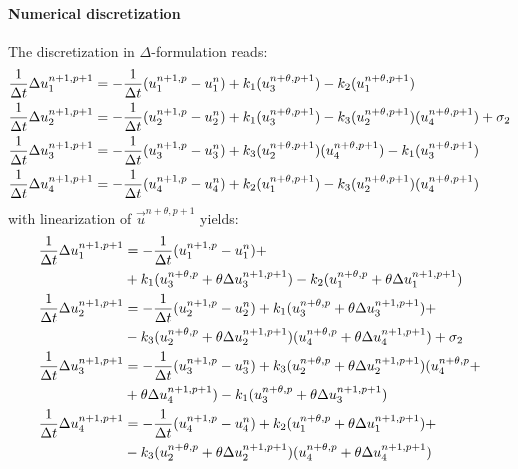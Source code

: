 \paragraph*{Numerical discretization}\label{sec:air_pollution_discretization}
The discretization in $\Delta$-formulation reads:
\begin{align}
    \frac{1}{\Delta t}\Delta u_1^{n+1, p+1} & = - \frac{1}{\Delta t}(u_1^{n+1,p} - u_1^n) + k_1 (u_3^{n+\theta,p+1}) - k_2 (u_1^{n+\theta,p+1})
    \\
    \frac{1}{\Delta t}\Delta u_2^{n+1, p+1} & = - \frac{1}{\Delta t}(u_2^{n+1,p} - u_2^n) + k_1(u_3^{n+\theta,p+1}) - k_3 (u_2^{n+\theta,p+1}) (u_4^{n+\theta,p+1}) +\sigma_2
    \\
    \frac{1}{\Delta t}\Delta u_3^{n+1, p+1} & = - \frac{1}{\Delta t}(u_3^{n+1,p} - u_3^n) + k_3 (u_2^{n+\theta,p+1}) (u_4^{n+\theta,p+1}) - k_1(u_3^{n+\theta,p+1})
    \\
    \frac{1}{\Delta t}\Delta u_4^{n+1, p+1} & = - \frac{1}{\Delta t}(u_4^{n+1,p} - u_4^n) + k_2(u_1^{n+\theta,p+1}) - k_3 (u_2^{n+\theta,p+1}) (u_4^{n+\theta,p+1})
\end{align}
with linearization of $\vec{u}^{n+\theta,p+1}$ yields:
\begin{align}
    \frac{1}{\Delta t}\Delta u_1^{n+1, p+1} & =
    - \frac{1}{\Delta t}(u_1^{n+1,p} - u_1^n) +
    \nonumber \\*
    & + k_1 (u_3^{n+\theta,p} + \theta \Delta u_3^{n+1, p+1}) - k_2 (u_1^{n+\theta,p} + \theta \Delta u_1^{n+1, p+1})
    \\
    \frac{1}{\Delta t}\Delta u_2^{n+1, p+1} & = - \frac{1}{\Delta t}(u_2^{n+1,p} - u_2^n) + k_1(u_3^{n+\theta,p} + \theta \Delta u_3^{n+1, p+1}) +
    \nonumber \\*
    & - k_3 (u_2^{n+\theta,p} + \theta \Delta u_2^{n+1, p+1}) (u_4^{n+\theta,p} + \theta \Delta u_4^{n+1, p+1}) +\sigma_2
    \\
    \frac{1}{\Delta t}\Delta u_3^{n+1, p+1} & = - \frac{1}{\Delta t}(u_3^{n+1,p} - u_3^n) + k_3 (u_2^{n+\theta,p} + \theta \Delta u_2^{n+1, p+1}) (u_4^{n+\theta,p} +
    \nonumber \\*
    & +  \theta \Delta u_4^{n+1, p+1}) - k_1(u_3^{n+\theta,p} + \theta \Delta u_3^{n+1, p+1})
    \\
    \frac{1}{\Delta t}\Delta u_4^{n+1, p+1} & = - \frac{1}{\Delta t}(u_4^{n+1,p} - u_4^n) + k_2(u_1^{n+\theta,p} + \theta \Delta u_1^{n+1, p+1}) +
    \nonumber \\*
    & - k_3 (u_2^{n+\theta,p} + \theta \Delta u_2^{n+1, p+1}) (u_4^{n+\theta,p} + \theta \Delta u_4^{n+1, p+1})
\end{align}
